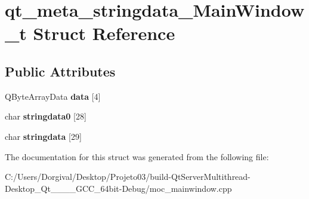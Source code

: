 \section{qt\+\_\+meta\+\_\+stringdata\+\_\+\+Main\+Window\+\_\+t Struct Reference}
\label{structqt__meta__stringdata___main_window__t}
\subsection*{Public Attributes}
\begin{DoxyCompactItemize}
\item 
\mbox{\label{structqt__meta__stringdata___main_window__t_ad1c9a50dd952529daa338bc095394f73}} 
Q\+Byte\+Array\+Data {\bfseries data} [4]
\item 
\mbox{\label{structqt__meta__stringdata___main_window__t_af7df47467e805e1341113891e0f6bc68}} 
char {\bfseries stringdata0} [28]
\item 
\mbox{\label{structqt__meta__stringdata___main_window__t_a87c5938844ce42892935b4932051707f}} 
char {\bfseries stringdata} [29]
\end{DoxyCompactItemize}


The documentation for this struct was generated from the following file\+:\begin{DoxyCompactItemize}
\item 
C\+:/\+Users/\+Dorgival/\+Desktop/\+Projeto03/build-\/\+Qt\+Server\+Multithread-\/\+Desktop\+\_\+\+Qt\+\_\+\_\+\_\+\_\+\+G\+C\+C\+\_\+64bit-\/\+Debug/moc\+\_\+mainwindow.\+cpp\end{DoxyCompactItemize}
